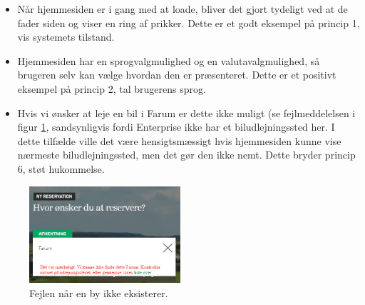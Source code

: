 \documentclass[a4paper]{article}
\begin{document}
\begin{itemize}
\item Når hjemmesiden er i gang med at loade, bliver det gjort tydeligt ved at de fader siden og viser en ring af prikker. Dette er et godt eksempel på princip 1, vis systemets tilstand.
\item Hjemmesiden har en sprogvalgmulighed og en valutavalgmulighed, så brugeren selv kan vælge hvordan den er præsenteret. Dette er et positivt eksempel på princip 2, tal brugerens sprog.
\item Hvis vi ønsker at leje en bil i Farum er dette ikke muligt (se fejlmeddelelsen i figur \ref{error-farum}, sandsynligvis fordi Enterprise ikke har et biludlejningssted her. I dette tilfælde ville det være hensigtsmæssigt hvis hjemmesiden kunne vise nærmeste biludlejningssted, men det gør den ikke nemt. Dette bryder princip 6, støt hukommelse.
\end{itemize}

\begin{figure}[!ht]
\centering
\includegraphics[width=0.5\textwidth]{error2.png}
\caption{Fejlen når en by ikke eksisterer.}
\label{error-farum}
\end{figure}
\end{document}
